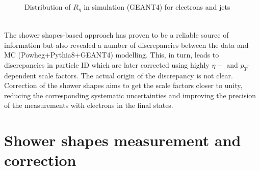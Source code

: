 \begin{figure}[htbp]
\caption{Distribution of $R_{\eta}$ in simulation (GEANT4) for electrons and jets}
\label{Reta_simul}
\end{figure}
\\
The shower shapes-based approach has proven to be a reliable source of information but also revealed a number of discrepancies between the data and MC (Powheg+Pythia8+GEANT4) modelling. This, in turn, leads to discrepancies in particle ID which are later corrected using highly $\eta-$ and $p_T$-dependent scale factors. 
The actual origin of the discrepancy is not clear.  \\
Correction of the shower shapes aims to get the scale factors closer to unity, reducing the corresponding systematic uncertainties and improving the precision of the measurements with electrons in the final states.  



\section{ Shower shapes measurement and correction  }
